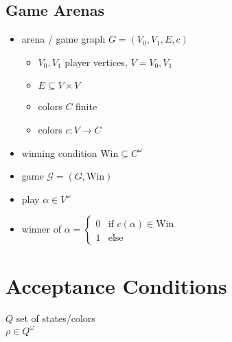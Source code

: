 \documentclass{article}
\begin{document}
\subsection{Game Arenas}
\begin{itemize}
	\item arena / game graph $G = (V_0, V_1, E, c)$
	\begin{itemize}
		\item $V_0, V_1$ player vertices, $V = V_0, V_1$
		\item $E \subseteq V \times V$
		\item colors $C$ finite
		\item colors $c : V \rightarrow C$
	\end{itemize}
	\item winning condition $\text{Win} \subseteq C^\omega$
	\item game $\mathcal{G} = (G, \text{Win})$
	\item play $\alpha \in V^\omega$
	\item winner of $\alpha = \begin{cases}0 & \text{if } c(\alpha) \in \text{Win} \\ 1 & \text{else}\end{cases}$
\end{itemize}


\newpage
\section{Acceptance Conditions}
$Q$ set of states/colors \\
$\rho \in Q^\omega$
\end{document}
